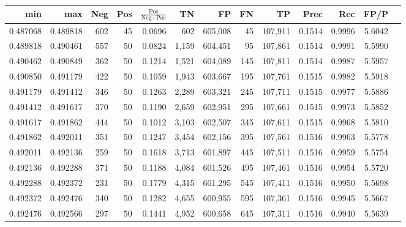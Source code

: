 \begin{tabular}{rrrrrrrrrrrrr}
\toprule
     min &      max & Neg & Pos & $\frac{\text{Pos}}{\text{Neg}+\text{Pos}}$ &      TN &      FP &      FN &      TP &   Prec &    Rec &   FP/P \\
\midrule
0.487068 & 0.489818 & 602 &  45 &                                     0.0696 &     602 & 605,008 &      45 & 107,911 & 0.1514 & 0.9996 & 5.6042 \\
0.489818 & 0.490461 & 557 &  50 &                                     0.0824 &   1,159 & 604,451 &      95 & 107,861 & 0.1514 & 0.9991 & 5.5990 \\
0.490462 & 0.490849 & 362 &  50 &                                     0.1214 &   1,521 & 604,089 &     145 & 107,811 & 0.1514 & 0.9987 & 5.5957 \\
0.490850 & 0.491179 & 422 &  50 &                                     0.1059 &   1,943 & 603,667 &     195 & 107,761 & 0.1515 & 0.9982 & 5.5918 \\
0.491179 & 0.491412 & 346 &  50 &                                     0.1263 &   2,289 & 603,321 &     245 & 107,711 & 0.1515 & 0.9977 & 5.5886 \\
0.491412 & 0.491617 & 370 &  50 &                                     0.1190 &   2,659 & 602,951 &     295 & 107,661 & 0.1515 & 0.9973 & 5.5852 \\
0.491617 & 0.491862 & 444 &  50 &                                     0.1012 &   3,103 & 602,507 &     345 & 107,611 & 0.1515 & 0.9968 & 5.5810 \\
0.491862 & 0.492011 & 351 &  50 &                                     0.1247 &   3,454 & 602,156 &     395 & 107,561 & 0.1516 & 0.9963 & 5.5778 \\
0.492011 & 0.492136 & 259 &  50 &                                     0.1618 &   3,713 & 601,897 &     445 & 107,511 & 0.1516 & 0.9959 & 5.5754 \\
0.492136 & 0.492288 & 371 &  50 &                                     0.1188 &   4,084 & 601,526 &     495 & 107,461 & 0.1516 & 0.9954 & 5.5720 \\
0.492288 & 0.492372 & 231 &  50 &                                     0.1779 &   4,315 & 601,295 &     545 & 107,411 & 0.1516 & 0.9950 & 5.5698 \\
0.492372 & 0.492476 & 340 &  50 &                                     0.1282 &   4,655 & 600,955 &     595 & 107,361 & 0.1516 & 0.9945 & 5.5667 \\
0.492476 & 0.492566 & 297 &  50 &                                     0.1441 &   4,952 & 600,658 &     645 & 107,311 & 0.1516 & 0.9940 & 5.5639 \\

\end{tabular}
